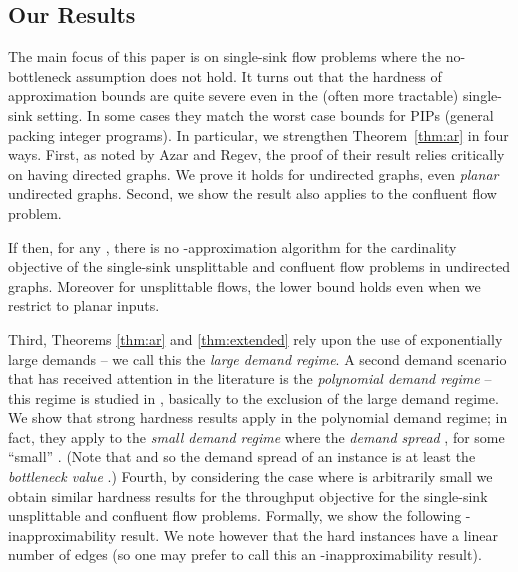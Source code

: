\documentclass[12pt]{article}
\begin{document}
\subsection{Our Results}\label{sec:results}
The main focus of this paper is on single-sink flow problems where the no-bottleneck assumption
does not hold. It turns out that the hardness of approximation bounds are quite severe
even in the (often more tractable) single-sink setting.
In some cases they  match the worst case bounds for PIPs (general packing integer programs).
In particular, we strengthen Theorem~\ref{thm:ar} in four ways.
First, as noted by Azar and Regev, the proof of their result relies critically
on having directed graphs.
We prove it holds for undirected graphs, even {\em planar} undirected graphs.
Second, we show the result also applies to the confluent
flow problem.
\begin{thm}
\label{thm:extended}
If  then, for any , there is no -approximation algorithm
for the cardinality objective of the single-sink unsplittable and confluent flow problems in undirected graphs.
Moreover for unsplittable flows, the lower bound holds even when we restrict to planar inputs.
\end{thm}

Third, Theorems \ref{thm:ar} and \ref{thm:extended} rely
upon the use of exponentially large demands -- we call this the {\em large demand regime}. A second
demand scenario that has received attention in the literature is the {\em polynomial demand regime} -- this regime
is studied in \cite{guruswami2003near}, basically to the exclusion of the large demand regime.
We show that strong hardness results apply in the polynomial demand regime; in fact,
they apply to the {\em small demand regime} where the {\em demand spread}
 , for some ``small'' .
(Note that  and so the demand spread of an instance is at least
the {\em bottleneck value} .)
Fourth, by considering the case where  is arbitrarily small we obtain
similar hardness results for the throughput objective for the single-sink unsplittable
and confluent flow problems.
Formally, we show the following -inapproximability result. We
note however that the hard instances have a linear number of edges (so one may prefer to
call this an -inapproximability result).
\end{document}
